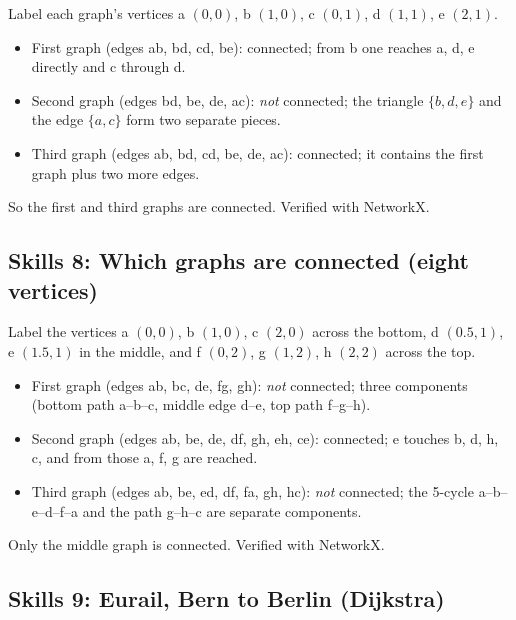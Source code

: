 Label each graph's vertices a $(0,0)$, b $(1,0)$, c $(0,1)$, d $(1,1)$, e $(2,1)$.
\begin{itemize}
\item First graph (edges ab, bd, cd, be): connected; from b one reaches a, d, e directly and c through d.
\item Second graph (edges bd, be, de, ac): \emph{not} connected; the triangle $\{b,d,e\}$ and the edge $\{a,c\}$ form two separate pieces.
\item Third graph (edges ab, bd, cd, be, de, ac): connected; it contains the first graph plus two more edges.
\end{itemize}
So the first and third graphs are connected. Verified with NetworkX.

\subsection*{Skills 8: Which graphs are connected (eight vertices)}

Label the vertices a $(0,0)$, b $(1,0)$, c $(2,0)$ across the bottom, d $(0.5,1)$, e $(1.5,1)$ in the middle, and f $(0,2)$, g $(1,2)$, h $(2,2)$ across the top.
\begin{itemize}
\item First graph (edges ab, bc, de, fg, gh): \emph{not} connected; three components (bottom path a--b--c, middle edge d--e, top path f--g--h).
\item Second graph (edges ab, be, de, df, gh, eh, ce): connected; e touches b, d, h, c, and from those a, f, g are reached.
\item Third graph (edges ab, be, ed, df, fa, gh, hc): \emph{not} connected; the 5-cycle a--b--e--d--f--a and the path g--h--c are separate components.
\end{itemize}
Only the middle graph is connected. Verified with NetworkX.

\subsection*{Skills 9: Eurail, Bern to Berlin (Dijkstra)}

